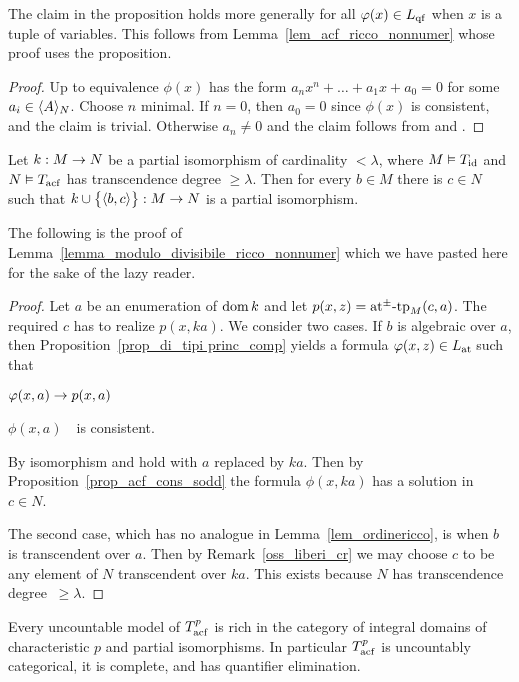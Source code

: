 \documentclass[creche.tex]{subfiles}
\begin{document}
The claim in the proposition holds more generally for all $\phi(x)\in L_{\rm qf}$ when $x$ is a tuple of variables. This follows from Lemma~\ref{lem_acf_ricco_nonnumer} whose proof uses the proposition.

\begin{proof}
Up to equivalence $\phi(x)$ has the form $a_nx^n + \dots + a_1 x + a_0=0$ for some $a_i\in\<A\>_N$. Choose $n$ minimal. If $n=0$, then $a_0=0$ since $\phi(x)$ is consistent, and the claim is trivial. Otherwise $a_n\neq0$ and the claim follows from  and . 
\end{proof}


\begin{lemma}\label{lem_acf_ricco_nonnumer}
Let $k:M\imp N$ be a partial isomorphism of cardinality $<\lambda$, where $M\models T_{\rm id}$ and $N\models T_{\rm acf}$ has transcendence degree $\ge\lambda$. Then for every $b\in M$ there is $c\in N$ such that $k\cup\big\{\<b,c\>\big\}:M\imp N$ is a partial isomorphism.
\end{lemma}

The following is the proof of Lemma~\ref{lemma_modulo_divisibile_ricco_nonnumer} which we have pasted here for the sake of the lazy reader.

\begin{proof}
Let $a$ be an enumeration of $\dom k$ and let $p(x,z)=\atpmtp_M(c,a)$. The required $c$ has to realize $p(x,ka)$. We consider two cases. If $b$ is algebraic over $a$, then Proposition~\ref{prop_di_tipi princ_comp} yields a formula $\phi(x,z)\in\atL$ such that 

\noindent{}\hspace{5ex} $\phi(x,a)\imp p(x,a)$

\noindent{}\hspace{5ex} $\phi(x,a)$\ \ is consistent.

By isomorphism  and  hold with $a$ replaced by $ka$. Then by Proposition~\ref{prop_acf_cons_sodd} the formula $\phi(x,ka)$ has a solution in $c\in N$.

The second case, which has no analogue in Lemma~\ref{lem_ordinericco}, is when $b$ is transcendent over $a$. Then by  Remark~\ref{oss_liberi_cr} we may choose $c$ to be any element of $N$ transcendent over $ka$. This exists because $N$ has transcendence degree $\ \ge\lambda$. 
\end{proof}

\begin{corollary}\label{corol_acfUltraOmog}
Every uncountable model of $T^p_{\rm acf}$ is rich in the category of integral domains of characteristic $p$ and partial isomorphisms. In particular $T^p_{\rm acf}$ is uncountably categorical, it is complete, and has quantifier elimination.
\end{corollary}
\end{document}
